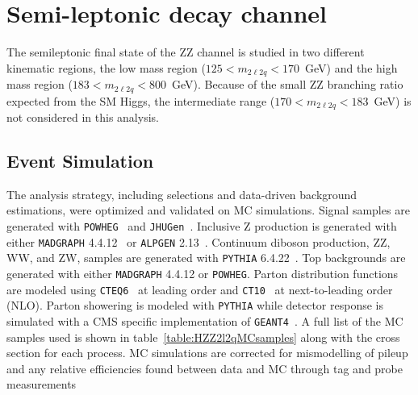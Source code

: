 
\section{Semi-leptonic decay channel}
\label{sec:HZZ2l2q}

The semileptonic final state of the ZZ channel is studied in two 
different kinematic regions, the low mass region 
($125 < m_{2\ell2q} < 170$~GeV) and the high mass region 
($183 < m_{2\ell2q} < 800$~GeV).  Because of the small ZZ branching ratio
expected from the SM Higgs, the intermediate range 
($170 < m_{2\ell2q} < 183$~GeV) is not considered in this analysis.

\subsection{Event Simulation}
\label{sec:HZZ2l2qSimulation}

The analysis strategy, including selections and data-driven background
estimations, were optimized and validated on MC simulations.  Signal
samples are generated with {\verb+POWHEG+}~\cite{??} and {\verb+JHUGen+}~\cite{??}.  
Inclusive Z 
production is generated with either {\verb+MADGRAPH+} 4.4.12~\cite{??} or
{\verb+ALPGEN+} 2.13~\cite{??}.  Continuum diboson production, ZZ, WW, 
and ZW, samples are generated with {\verb+PYTHIA+} 6.4.22~\cite{???}.  
Top backgrounds are generated with either {\verb+MADGRAPH+} 4.4.12 or 
{\verb+POWHEG+}.  Parton distribution functions are modeled using 
{\verb+CTEQ6+}~\cite{???} at leading order and {\verb+CT10+}~\cite{??} at 
next-to-leading order (NLO).  Parton showering is modeled with {\verb+PYTHIA+}
while detector response is simulated with a CMS specific implementation
of {\verb+GEANT4+}~\cite{??}.  A full list of the MC samples used is shown 
in table~\ref{table:HZZ2l2qMCsamples} along with the cross section for each process.  
MC simulations are corrected for mismodelling of pileup and any relative 
efficiencies found between data and MC through tag and probe 
measurements

